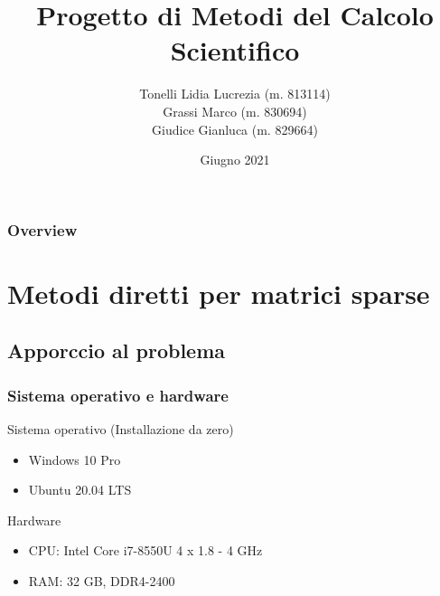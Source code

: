 \documentclass{beamer}
\title{Progetto di Metodi del Calcolo Scientifico} %
\author{Tonelli Lidia Lucrezia (m. 813114)\\
Grassi Marco (m. 830694)\\
Giudice Gianluca (m. 829664)
} %
\institute[University of Milano Bicocca] %
{
University of Milano Bicocca \\ %
\medskip
}
\date{Giugno 2021} %
\begin{document}
\begin{frame}
\titlepage %
\end{frame}

\begin{frame}
\frametitle{Overview} %
\tableofcontents %
\end{frame}


\section{Metodi diretti per matrici sparse}

\subsection{Apporccio al problema}

\begin{frame}
	
	\frametitle{Sistema operativo e hardware }
	Sistema operativo (Installazione da zero)
	\begin{itemize}
		\item Windows 10 Pro
		\item Ubuntu 20.04 LTS
	\end{itemize}

	Hardware
	\begin{itemize}
		\item CPU: Intel Core i7-8550U 4 x 1.8 - 4 GHz
		\item RAM: 32 GB, DDR4-2400
	\end{itemize}
\end{frame}
\end{document}
